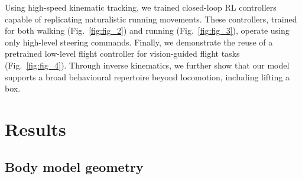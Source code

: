 \documentclass[sn-mathphys-num]{sn-jnl}%
\theoremstyle{thmstyleone}%
\theoremstyle{thmstyletwo}%
\theoremstyle{thmstylethree}%
\begin{document}
Using high-speed kinematic tracking\cite{branson2009high,pereira2022sleap}, we trained closed-loop RL controllers capable of replicating naturalistic running movements. 
These controllers, trained for both walking (Fig.~\ref{fig:fig_2}) and running (Fig.~\ref{fig:fig_3}), operate using only high-level steering commands. 
Finally, we demonstrate the reuse of a pretrained low-level flight controller for vision-guided flight tasks (Fig.~\ref{fig:fig_4}). 
Through inverse kinematics, we further show that our model supports a broad behavioural repertoire beyond locomotion, including lifting a box.



%

\section{Results}\label{sec3}

		

\subsection{Body model geometry}
\end{document}
